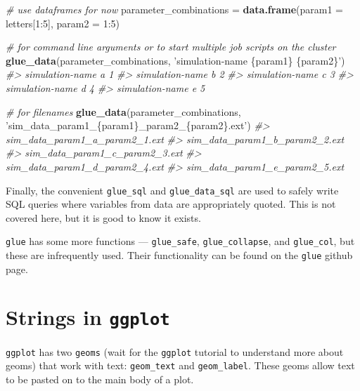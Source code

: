 \documentclass[]{book}
\newenvironment{Shaded}{}{}
\newcommand{\CommentTok}[1]{\textcolor[rgb]{0.38,0.63,0.69}{\textit{#1}}}
\newcommand{\DataTypeTok}[1]{\textcolor[rgb]{0.56,0.13,0.00}{#1}}
\newcommand{\DecValTok}[1]{\textcolor[rgb]{0.25,0.63,0.44}{#1}}
\newcommand{\KeywordTok}[1]{\textcolor[rgb]{0.00,0.44,0.13}{\textbf{#1}}}
\newcommand{\NormalTok}[1]{#1}
\newcommand{\OperatorTok}[1]{\textcolor[rgb]{0.40,0.40,0.40}{#1}}
\newcommand{\StringTok}[1]{\textcolor[rgb]{0.25,0.44,0.63}{#1}}
\begin{document}
\begin{Shaded}
\begin{Highlighting}[]
\CommentTok{# use dataframes for now}
\NormalTok{parameter_combinations =}\StringTok{ }\KeywordTok{data.frame}\NormalTok{(}\DataTypeTok{param1 =}\NormalTok{ letters[}\DecValTok{1}\OperatorTok{:}\DecValTok{5}\NormalTok{],}
                                    \DataTypeTok{param2 =} \DecValTok{1}\OperatorTok{:}\DecValTok{5}\NormalTok{)}

\CommentTok{# for command line arguments or to start multiple job scripts on the cluster}
\KeywordTok{glue_data}\NormalTok{(parameter_combinations,}
          \StringTok{'simulation-name \{param1\} \{param2\}'}\NormalTok{)}
\CommentTok{#> simulation-name a 1}
\CommentTok{#> simulation-name b 2}
\CommentTok{#> simulation-name c 3}
\CommentTok{#> simulation-name d 4}
\CommentTok{#> simulation-name e 5}

\CommentTok{# for filenames}
\KeywordTok{glue_data}\NormalTok{(parameter_combinations,}
          \StringTok{'sim_data_param1_\{param1\}_param2_\{param2\}.ext'}\NormalTok{)}
\CommentTok{#> sim_data_param1_a_param2_1.ext}
\CommentTok{#> sim_data_param1_b_param2_2.ext}
\CommentTok{#> sim_data_param1_c_param2_3.ext}
\CommentTok{#> sim_data_param1_d_param2_4.ext}
\CommentTok{#> sim_data_param1_e_param2_5.ext}
\end{Highlighting}
\end{Shaded}

Finally, the convenient \texttt{glue\_sql} and \texttt{glue\_data\_sql} are used to safely write SQL queries where variables from data are appropriately quoted. This is not covered here, but it is good to know it exists.

\texttt{glue} has some more functions --- \texttt{glue\_safe}, \texttt{glue\_collapse}, and \texttt{glue\_col}, but these are infrequently used. Their functionality can be found on the \texttt{glue} github page.

\hypertarget{strings-in-ggplot}{%
\section{\texorpdfstring{Strings in \texttt{ggplot}}{Strings in ggplot}}\label{strings-in-ggplot}}

\texttt{ggplot} has two \texttt{geoms} (wait for the \texttt{ggplot} tutorial to understand more about geoms) that work with text: \texttt{geom\_text} and \texttt{geom\_label}. These geoms allow text to be pasted on to the main body of a plot.
\end{document}
